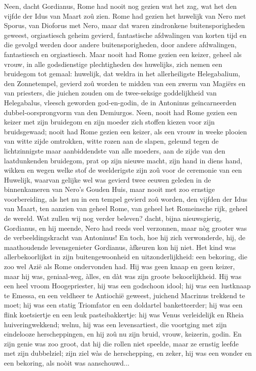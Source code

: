 \documentclass[a4paper, 12pt, oneside, dutch]{article}
\begin{document}
Neen, dacht Gordianus, Rome had nooit nog gezien wat het zag, wat het den vijfde der Idus van Maart zoû zien. Rome had gezien het huwelijk van Nero met Sporus, van Dioforus met Nero, maar dat waren zindronkene buitensporigheden geweest, orgiastiesch geheim gevierd, fantastische afdwalingen van korten tijd en die gevolgd werden door andere buitensporigheden, door andere afdwalingen, fantastiesch en orgiastiesch. Maar nooit had Rome gezien een keizer, geheel als vrouw, in alle godsdienstige plechtigheden des huwelijks, zich nemen een bruidegom tot gemaal: huwelijk, dat weldra in het allerheiligste Helegabalium, den Zonnetempel, gevierd zoû worden te midden van een zwerm van Magiërs en van priesters, die juichen zouden om de twee-seksige goddelijkheid van Helegabalus, vleesch geworden god-en-godin, de in Antoninus geïncarneerden dubbel-oorsprongvorm van den Demiurgos. Neen, nooit had Rome gezien een keizer met zijn bruidegom en zijn moeder zich stoffen kiezen voor zijn bruidsgewaad; nooit had Rome gezien een keizer, als een vrouw in weeke plooien van witte zijde omtrokken, witte rozen aan de slapen, geleund tegen de lichtzinnigste maar aanbiddendste van alle moeders, aan de zijde van den laatdunkenden bruidegom, prat op zijn nieuwe macht, zijn hand in diens hand, wikken en wegen welke stof de weelderigste zijn zoû voor de ceremonie van een Huwelijk, waarvan gelijke wel was gevierd twee eeuwen geleden in de binnenkameren van Nero's Gouden Huis, maar nooit met zoo ernstige voorbereiding, als het nu in een tempel gevierd zoû worden, den vijfden der Idus van Maart, ten aanzien van geheel Rome, van geheel het Romeinsche rijk, geheel de wereld. Wat zullen wij nog verder beleven? dacht, bijna nieuwsgierig, Gordianus, en hij meende, Nero had reeds veel verzonnen, maar nòg grooter was de verbeeldingskracht van Antoninus! En toch, hoe hij zich verwonderde, hij, de maathoudende levensgenieter Gordianus, àfkeuren kon hij niet. Het kind was allerbekoorlijkst in zijn buitengewoonheid en uitzonderlijkheid: een bekoring, die zoo wel Azië als Rome ondervonden had. Hij was geen knaap en geen keizer, maar hij was, geniaal-weg, àlles, en dàt was zijn groote bekoorlijkheid. Hij was een heel vroom Hoogepriester, hij was een godschoon idool; hij was een lustknaap te Emessa, en een veldheer te Antiochië geweest, juichend Macrinus trekkend te moet; hij was een statig Triomfator en een doldartel banketteerder; hij was een flink koetsiertje en een leuk pasteibakkertje: hij was Venus verleidelijk en Rheia huiveringwekkend; welnu, hij was een levensartiest, die voortging met zijn eindelooze herscheppingen, en hij zoû nu zijn bruid, vrouw, keizerin, godin. En zijn genie was zoo groot, dat hij die rollen niet speelde, maar ze ernstig leefde met zijn dubbelziel; zijn ziel wàs de herschepping, en zeker, hij was een wonder en een bekoring, als noòit was aanschouwd...
\end{document}
